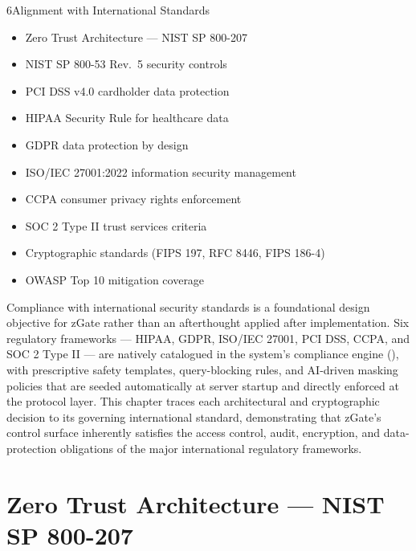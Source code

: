 
\begin{sectionintro}{6}{Alignment with International Standards}{
  \begin{itemize}[leftmargin=1.5em]
    \item Zero Trust Architecture --- NIST SP 800-207
    \item NIST SP 800-53 Rev.\ 5 security controls
    \item PCI DSS v4.0 cardholder data protection
    \item HIPAA Security Rule for healthcare data
    \item GDPR data protection by design
    \item ISO/IEC 27001:2022 information security management
    \item CCPA consumer privacy rights enforcement
    \item SOC 2 Type II trust services criteria
    \item Cryptographic standards (FIPS 197, RFC 8446, FIPS 186-4)
    \item OWASP Top 10 mitigation coverage
  \end{itemize}
}
Compliance with international security standards is a foundational design objective for zGate rather than an afterthought applied after implementation. Six regulatory frameworks --- HIPAA, GDPR, ISO/IEC 27001, PCI DSS, CCPA, and SOC 2 Type II --- are natively catalogued in the system's compliance engine (), with prescriptive safety templates, query-blocking rules, and AI-driven masking policies that are seeded automatically at server startup and directly enforced at the protocol layer. This chapter traces each architectural and cryptographic decision to its governing international standard, demonstrating that zGate's control surface inherently satisfies the access control, audit, encryption, and data-protection obligations of the major international regulatory frameworks.
\end{sectionintro}

\section{Zero Trust Architecture --- NIST SP 800-207}

